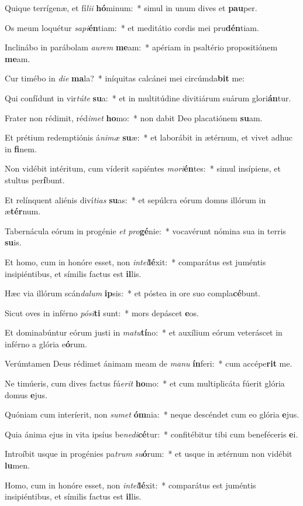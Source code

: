 \item Quique terrígenæ, et fí\textit{li}\textit{i} \textbf{hó}minum:~* simul in unum dives et \textbf{pau}per.
\item Os meum loquétur \textit{sa}\textit{pi}\textbf{én}tiam:~* et meditátio cordis mei pru\textbf{dén}tiam.
\item Inclinábo in parábolam \textit{au}\textit{rem} \textbf{me}am:~* apériam in psaltério propositiónem \textbf{me}am.
\item Cur timébo in \textit{di}\textit{e} \textbf{ma}la?~* iníquitas calcánei mei circúmda\textbf{bit} me:
\item Qui confídunt in vir\textit{tú}\textit{te} \textbf{su}a:~* et in multitúdine divitiárum suárum glori\textbf{án}tur.
\item Frater non rédimit, réd\textit{i}\textit{met} \textbf{ho}mo:~* non dabit Deo placatiónem \textbf{su}am.
\item Et prétium redemptiónis á\textit{ni}\textit{mæ} \textbf{su}æ:~* et laborábit in ætérnum, et vivet adhuc in \textbf{fi}nem.
\item Non vidébit intéritum, cum víderit sapiéntes \textit{mo}\textit{ri}\textbf{én}tes:~* simul insípiens, et stultus per\textbf{í}bunt.
\item Et relínquent aliénis diví\textit{ti}\textit{as} \textbf{su}as:~* et sepúlcra eórum domus illórum in æ\textbf{tér}num.
\item Tabernácula eórum in progénie \textit{et} \textit{pro}\textbf{gé}nie:~* vocavérunt nómina sua in terris \textbf{su}is.
\item Et homo, cum in honóre esset, non \textit{in}\textit{tel}\textbf{lé}xit:~* comparátus est juméntis insipiéntibus, et símilis factus est \textbf{il}lis.
\item Hæc via illórum scán\textit{da}\textit{lum} \textbf{ip}sis:~* et póstea in ore suo compla\textbf{cé}bunt.
\item Sicut oves in inférno \textit{pó}\textit{si}\textbf{ti} sunt:~* mors depáscet \textbf{e}os.
\item Et dominabúntur eórum justi in \textit{ma}\textit{tu}\textbf{tí}no:~* et auxílium eórum veteráscet in inférno a glória e\textbf{ó}rum.
\item Verúmtamen Deus rédimet ánimam meam de \textit{ma}\textit{nu} \textbf{ín}feri:~* cum accépe\textbf{rit} me.
\item Ne timúeris, cum dives factus fú\textit{e}\textit{rit} \textbf{ho}mo:~* et cum multiplicáta fúerit glória domus \textbf{e}jus.
\item Quóniam cum interíerit, non \textit{su}\textit{met} \textbf{óm}nia:~* neque descéndet cum eo glória \textbf{e}jus.
\item Quia ánima ejus in vita ipsíus be\textit{ne}\textit{di}\textbf{cé}tur:~* confitébitur tibi cum beneféceris \textbf{e}i.
\item Introíbit usque in progénies pa\textit{trum} \textit{su}\textbf{ó}rum:~* et usque in ætérnum non vidébit \textbf{lu}men.
\item Homo, cum in honóre esset, non \textit{in}\textit{tel}\textbf{lé}xit:~* comparátus est juméntis insipiéntibus, et símilis factus est \textbf{il}lis.
